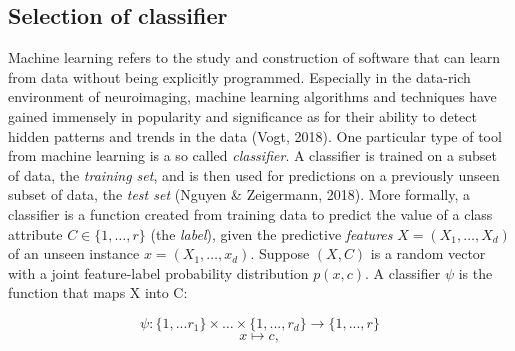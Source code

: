 \documentclass[a4paper, 12pt]{scrreprt}
\begin{document}
\subsection{Selection of classifier}
Machine learning refers to the study and construction of software that can learn from data without being explicitly programmed. Especially in the data-rich environment of neuroimaging, machine learning algorithms and techniques have gained immensely in popularity and significance as for their ability to detect hidden patterns and trends in the data (Vogt, 2018). One particular type of tool from machine learning is a so called \textit{classifier}. A classifier is trained on a subset of data, the \textit{training set}, and is then used for predictions on a previously unseen subset of data, the \textit{test set} (Nguyen \& Zeigermann, 2018). \newline
More formally, a classifier is a function created from training data to predict the value of a class attribute $C \in \{1, \ldots, r\}$ (the \textit{label}), given the predictive \textit{features} $X = (X_1, \ldots, X_d)$ of an unseen instance $x = (X_1, \ldots, x_d)$. Suppose $(X, C)$ is a random vector with a joint feature-label probability distribution $p(x, c)$. A classifier $\psi$ is the function that maps X into C:

\begin{equation}\label{classifier}
\psi: \{1, ... r_1\} \times  \ldots \times \{1, ..., r_d\} \rightarrow \{1, ..., r\}
\end{equation}
\begin{equation}
x \mapsto c,
\end{equation}
\end{document}
